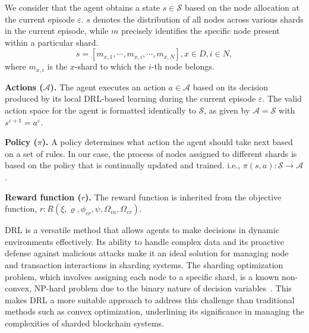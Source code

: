 \smallskip
We consider that the agent obtains a state $s \in \mathcal{S}$ based on the node allocation at the current episode $\varepsilon$. $s$ denotes the distribution of all nodes across various shards in the current episode, while $m$ precisely identifies the specific node present within a particular shard.
\begin{equation}
    \label{eq:23}
    s = \left [ m_{x,1}, \cdots, m_{x,i}, \cdots, m_{x,N} \right ], x \in D, i \in N,
\end{equation}
where $m_{x,i}$ is the $x$-shard to which the $i$-th node belongs.







\smallskip
\noindent\textbf{Actions ($\mathcal{A}$).} 
The agent executes an action $a \in \mathcal{A}$ based on its decision produced by its local DRL-based learning during the current episode $\varepsilon$. The valid action space for the agent is formatted identically to $\mathcal{S}$, as given by
$\mathcal{A}=\mathcal{S}$ with $s^{\varepsilon+1}=a^{\varepsilon}$.

\smallskip
\noindent\textbf{Policy ($\pi$).}
A policy determines what action the agent should take next based on a set of rules. In our case, the process of nodes assigned to different shards is based on the policy that is continually updated and trained.  i.e., $ \pi (s, a): \mathcal{S} \rightarrow \mathcal{A}$.

\smallskip
\noindent\textbf{Reward function ($r$).}
The reward function is inherited from the objective function, $r: R(\xi, \varrho, \phi_{cr}, \psi, \Omega_{in}, \Omega_{cr} )$.

DRL is a versatile method that allows agents to make decisions in dynamic environments effectively. Its ability to handle complex data and its proactive defense against malicious attacks make it an ideal solution for managing node and transaction interactions in sharding systems. The sharding optimization problem, which involves assigning each node to a specific shard, is a known non-convex, NP-hard problem due to the binary nature of decision variables~\cite{9500403}. This makes DRL a more suitable approach to address this challenge than traditional methods such as convex optimization, underlining its significance in managing the complexities of sharded blockchain systems.